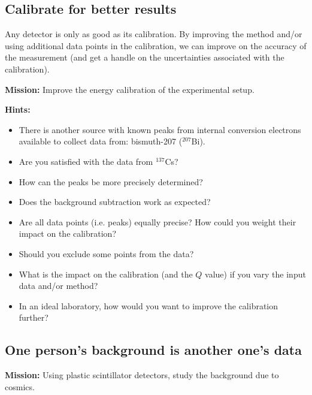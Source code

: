 \documentclass[a4,11pt, notitlepage]{article}
\begin{document}
\subsection{Calibrate for better results}
\label{sec:calibrate}

Any detector is only as good as its calibration. By improving the
method and/or using additional data points in the calibration, we can
improve on the accuracy of the measurement (and get a handle on the
uncertainties associated with the calibration).

\noindent\textbf{Mission:} Improve the energy calibration of the experimental setup.

\noindent\textbf{Hints:}
\begin{itemize}
\item There is another source with known peaks from internal
  conversion electrons available to collect data from: bismuth-207
  ($^{207}$Bi).
\item Are you satisfied with the data from $^{137}$Cs?
\item How can the peaks be more precisely determined?
\item Does the background subtraction work as expected?
\item Are all data points (i.e. peaks) equally precise? How could you
  weight their impact on the calibration?
\item Should you exclude some points from the data?
\item What is the impact on the calibration (and the $Q$ value) if you
  vary the input data and/or method?
\item In an ideal laboratory, how would you want to improve the
  calibration further?
\end{itemize}

\subsection{One person's background is another one's data}
\label{sec:background}

\noindent\textbf{Mission:} Using plastic scintillator detectors, study the
background due to cosmics.
\end{document}
